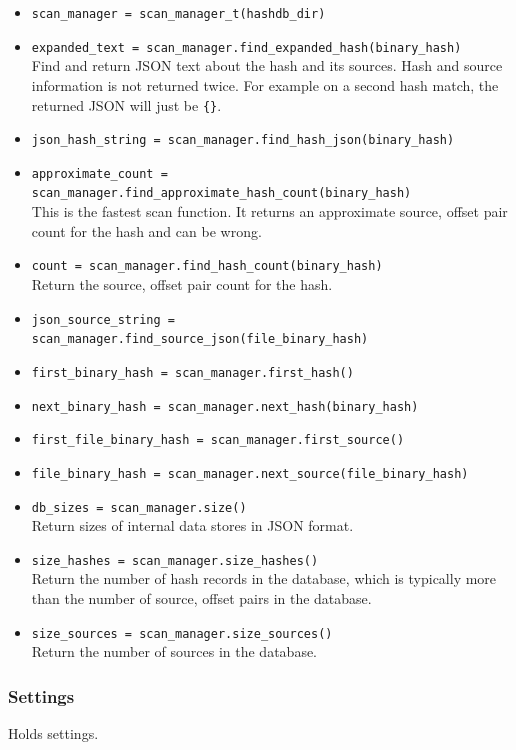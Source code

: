 \documentclass[11pt,fleqn]{article} %
\begin{document}
\begin{itemize}
\item \verb+scan_manager = scan_manager_t(hashdb_dir)+
\item \verb+expanded_text = scan_manager.find_expanded_hash(binary_hash)+\\
Find and return JSON text about the hash and its sources. Hash and source information is not returned twice. For example on a second hash match, the returned JSON will just be \verb+{}+.
\item \verb+json_hash_string = scan_manager.find_hash_json(binary_hash)+
\item \verb+approximate_count = scan_manager.find_approximate_hash_count(binary_hash)+\\
This is the fastest scan function. It returns an approximate source, offset pair count for the hash and can be wrong.
\item \verb+count = scan_manager.find_hash_count(binary_hash)+\\
Return the source, offset pair count for the hash.
\item \verb+json_source_string = scan_manager.find_source_json(file_binary_hash)+
\item \verb+first_binary_hash = scan_manager.first_hash()+
\item \verb+next_binary_hash = scan_manager.next_hash(binary_hash)+
\item \verb+first_file_binary_hash = scan_manager.first_source()+
\item \verb+file_binary_hash = scan_manager.next_source(file_binary_hash)+
\item \verb+db_sizes = scan_manager.size()+\\
Return sizes of internal data stores in JSON format.
\item \verb+size_hashes = scan_manager.size_hashes()+\\
Return the number of hash records in the database, which is typically more than the number of source, offset pairs in the database.
\item \verb+size_sources = scan_manager.size_sources()+\\
Return the number of sources in the database.
\end{itemize}

\subsubsection{Settings}
Holds \hdb settings.
\end{document}
